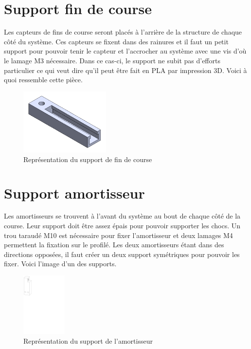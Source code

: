 \section{Support fin de course}\label{sec:SupFinCourse}
Les capteurs de fins de course seront placés à l'arrière de la structure de chaque côté du système. Ces capteurs se fixent dans des rainures et
il faut un petit support pour pouvoir tenir le capteur et l'accrocher au système avec une vis d'où le lamage M3 nécessaire. Dans ce cas-ci, le
support ne subit pas d'efforts particulier ce qui veut dire qu'il peut être fait en \acrshort{PLA} par impression 3D. Voici à quoi ressemble
cette pièce.

\begin{figure}[H]
  \centering
  \includegraphics[width = 0.4\textwidth]{assets/figures/SupportFinCourse.png}
  \caption{Représentation du support de fin de course}
  \label{fig:SupFinCourse}
\end{figure}

\section{Support amortisseur}\label{sec:SupAmort}
Les amortisseurs se trouvent à l'avant du système au bout de chaque côté de la course. Leur support doit être assez épais pour pouvoir supporter
les chocs. Un trou taraudé M10 est nécessaire pour fixer l'amortisseur et deux lamages M4 permettent la fixation sur le profilé. Les deux amortisseurs
étant dans des directions opposées, il faut créer un deux support symétriques pour pouvoir les fixer. Voici l'image d'un des supports.

\begin{figure}[H]
  \centering
  \includegraphics[width = 0.2\textwidth]{assets/figures/SupportAmortisseur.svg}
  \caption{Représentation du support de l'amortisseur}
  \label{fig:SupAmort}
\end{figure}

